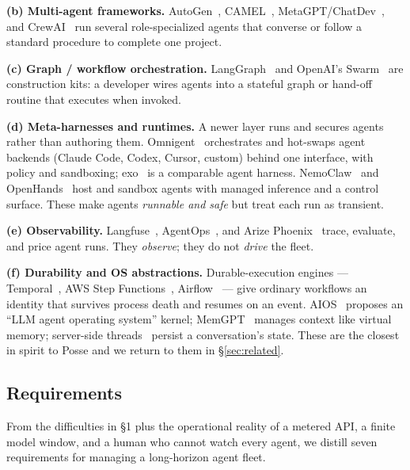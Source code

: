 \documentclass[10pt,twocolumn]{article}
\begin{document}
\noindent\textbf{(b) Multi-agent frameworks.} AutoGen~\cite{autogen},
CAMEL~\cite{camel}, MetaGPT/ChatDev~\cite{metagpt,chatdev}, and CrewAI~\cite{crewai}
run several role-specialized agents that converse or follow a standard procedure to
complete one project.

\noindent\textbf{(c) Graph / workflow orchestration.} LangGraph~\cite{langgraph}
and OpenAI's Swarm~\cite{swarm} are construction kits: a developer wires agents into a
stateful graph or hand-off routine that executes when invoked.

\noindent\textbf{(d) Meta-harnesses and runtimes.} A newer layer runs and secures
agents rather than authoring them. Omnigent~\cite{omnigent} orchestrates and hot-swaps
agent backends (Claude Code, Codex, Cursor, custom) behind one interface, with policy
and sandboxing; exo~\cite{exo} is a comparable agent harness. NemoClaw~\cite{nemoclaw}
and OpenHands~\cite{openhands} host and sandbox agents with managed inference and a
control surface. These make agents \emph{runnable and safe} but treat each run as
transient.

\noindent\textbf{(e) Observability.} Langfuse~\cite{langfuse},
AgentOps~\cite{agentops}, and Arize Phoenix~\cite{phoenix} trace, evaluate, and price
agent runs. They \emph{observe}; they do not \emph{drive} the fleet.

\noindent\textbf{(f) Durability and OS abstractions.} Durable-execution engines ---
Temporal~\cite{temporal}, AWS Step Functions~\cite{stepfns}, Airflow~\cite{airflow} ---
give ordinary workflows an identity that survives process death and resumes on an
event. AIOS~\cite{aios} proposes an ``LLM agent operating system'' kernel;
MemGPT~\cite{memgpt} manages context like virtual memory; server-side
threads~\cite{assistants} persist a conversation's state. These are the closest in
spirit to Posse and we return to them in \S\ref{sec:related}.

\subsection{Requirements}
\label{sec:reqs}
From the difficulties in \S1 plus the operational reality of a metered API, a finite
model window, and a human who cannot watch every agent, we distill seven requirements
for managing a long-horizon agent fleet.
\end{document}
